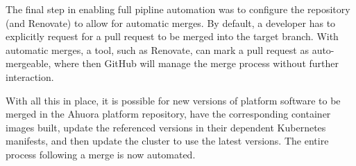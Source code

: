 The final step in enabling full pipline automation was to configure the repository (and Renovate) to allow for automatic merges. By default, a developer has to explicitly request for a pull request to be merged into the target branch. With automatic merges, a tool, such as Renovate, can mark a pull request as auto-mergeable, where then GitHub will manage the merge process without further interaction.

With all this in place, it is possible for new versions of platform software to be merged in the Ahuora platform repository, have the corresponding container images built, update the referenced versions in their dependent Kubernetes manifests, and then update the cluster to use the latest versions. The entire process following a merge is now automated.

